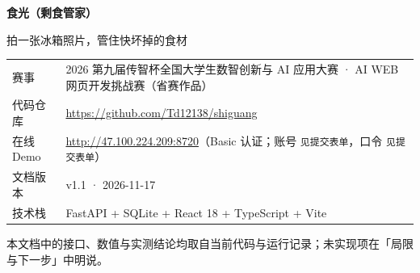 \documentclass[11pt,a4paper]{ctexart}
\renewcommand{\arraystretch}{1.25}
\newcommand{\DemoUser}{见提交表单}%
\newcommand{\DemoPass}{见提交表单}%
\begin{document}
\begin{titlepage}
\thispagestyle{empty}
\vspace*{2.2cm}
{\Huge\bfseries 食光（剩食管家）\par}
\vspace{0.6cm}
{\Large\color{accent} 拍一张冰箱照片，管住快坏掉的食材\par}
\vspace{2.2cm}
{\large
\renewcommand{\arraystretch}{1.6}
\begin{tabularx}{\textwidth}{@{}p{}X@{}}
\toprule
赛事 & 2026 第九届传智杯全国大学生数智创新与 AI 应用大赛 · AI WEB 网页开发挑战赛（省赛作品） \\
代码仓库 & \url{https://github.com/Td12138/shiguang} \\
在线 Demo & \url{http://47.100.224.209:8720}（Basic 认证；账号 \texttt{\DemoUser}，口令 \texttt{\DemoPass}） \\
文档版本 & v1.1 · 2026-11-17 \\
技术栈 & FastAPI + SQLite + React 18 + TypeScript + Vite \\
\bottomrule
\end{tabularx}\par}
\vfill
{\small\color{gray} 本文档中的接口、数值与实测结论均取自当前代码与运行记录；未实现项在「局限与下一步」中明说。\par}
\end{titlepage}

\tableofcontents
\newpage


\end{document}
